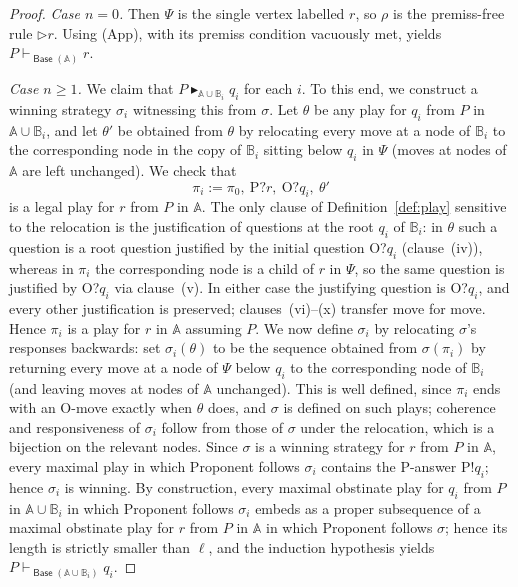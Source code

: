 \documentclass{lipics-v2021}
\newcommand{\deriv}[1]{\vdash_{#1}}       %
\newcommand{\supp}[1]{\Vdash_{#1}}
\newcommand{\wstrat}[1]{\blacktriangleright_{#1}}            %
\newcommand{\arena}[1]{\mathbb{#1}}                     %
\newcommand{\brule}[1]{\triangleright{#1}}         %
\newcommand{\tobase}[1]{\mathrel{\textsf{Base}}(#1)}            %
\begin{document}
\begin{proof}
\noindent\emph{Case $n = 0$.} Then $\Psi$ is the single vertex labelled $r$,
so $\rho$ is the premiss-free rule $\brule r$. Using (App), with its premiss condition
vacuously met, yields $P \deriv{\tobase{\arena{A}}} r$.
 
\medskip
 
\noindent\emph{Case $n \ge 1$.} We claim that $P \wstrat{\arena{A} \cup \arena{B}_i} q_i$ for each $i$. To this end, we construct a winning strategy $\sigma_i$ witnessing this from $\sigma$.
Let
$\theta$ be any play for $q_i$ from $P$ in $\arena{A} \cup \arena{B}_i$, and
let $\theta'$ be obtained from $\theta$ by relocating every move at a node of
$\arena{B}_i$ to the corresponding node in the copy of $\arena{B}_i$ sitting
below $q_i$ in $\Psi$ (moves at nodes of $\arena{A}$ are left unchanged). We check that
\[
\pi_i := \pi_0,\ \text{P?}r,\ \text{O?}q_i,\ \theta'
\]
is a legal play for $r$ from $P$ in $\arena{A}$. The only clause of
Definition~\ref{def:play} sensitive to the relocation is the justification of
questions at the root $q_i$ of $\arena{B}_i$: in $\theta$ such a question is a
root question justified by the initial question O?$q_i$ (clause~(iv)), whereas
in $\pi_i$ the corresponding node is a child of $r$ in $\Psi$, so the
same question is justified by O?$q_i$ via clause~(v). In either case the
justifying question is O?$q_i$, and every other justification is preserved;
clauses~(vi)--(x) transfer move for move. Hence $\pi_i$ is a play for $r$ in $\arena{A}$ assuming $P$.
We now define $\sigma_i$ by relocating $\sigma$'s responses backwards: set
$\sigma_i(\theta)$ to be the sequence obtained from $\sigma(\pi_i)$ by
returning every move at a node of $\Psi$ below $q_i$ to the corresponding node
of $\arena{B}_i$ (and leaving moves at nodes of $\arena{A}$ unchanged). This is
well defined, since $\pi_i$ ends with an O-move exactly when $\theta$
does, and $\sigma$ is defined on such plays; coherence and responsiveness of
$\sigma_i$ follow from those of $\sigma$ under the relocation, which is a
bijection on the relevant nodes. Since $\sigma$ is a winning strategy for $r$ from $P$ in $\arena{A}$, every maximal play in which Proponent follows $\sigma_i$ contains the P-answer P!$q_i$; hence $\sigma_i$ is winning.
By construction, every maximal obstinate play for $q_i$ from $P$ in
$\arena{A} \cup \arena{B}_i$ in which Proponent follows $\sigma_i$ embeds as a
proper subsequence of a maximal obstinate play for $r$ from $P$ in $\arena{A}$
in which Proponent follows $\sigma$; hence its length is strictly smaller than
$\ell$, and the induction hypothesis yields $P \deriv{\tobase{\arena{A} \cup \arena{B}_i}} q_i$.


\end{proof}
\end{document}
